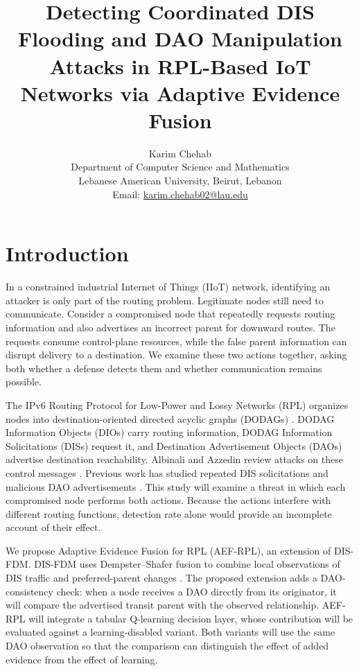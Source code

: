\documentclass[journal]{IEEEtran}
\title{Detecting Coordinated DIS Flooding and DAO Manipulation Attacks in RPL-Based IoT Networks via Adaptive Evidence Fusion}
\author{Karim Chehab\\[0.5ex]
\normalsize Department of Computer Science and Mathematics\\
\normalsize Lebanese American University, Beirut, Lebanon\\
\normalsize Email: \href{mailto:karim.chehab02@lau.edu}{karim.chehab02@lau.edu}}
\date{}
\begin{document}
\maketitle

\section{Introduction}\label{sec:introduction}
In a constrained industrial Internet of Things (IIoT) network, identifying an attacker is only part of the routing problem. Legitimate nodes still need to communicate. Consider a compromised node that repeatedly requests routing information and also advertises an incorrect parent for downward routes. The requests consume control-plane resources, while the false parent information can disrupt delivery to a destination. We examine these two actions together, asking both whether a defense detects them and whether communication remains possible.

The IPv6 Routing Protocol for Low-Power and Lossy Networks (RPL) organizes nodes into destination-oriented directed acyclic graphs (DODAGs) \cite{rfc6550}. DODAG Information Objects (DIOs) carry routing information, DODAG Information Solicitations (DISs) request it, and Destination Advertisement Objects (DAOs) advertise destination reachability. Albinali and Azzedin review attacks on these control messages \cite{albinali2024}. Previous work has studied repeated DIS solicitations \cite{rajasekar2022,vermaranga2020,medjek2021} and malicious DAO advertisements \cite{pu2018,limsd2024}. This study will examine a threat in which each compromised node performs both actions. Because the actions interfere with different routing functions, detection rate alone would provide an incomplete account of their effect.

We propose Adaptive Evidence Fusion for RPL (AEF-RPL), an extension of DIS-FDM. DIS-FDM uses Dempster--Shafer fusion to combine local observations of DIS traffic and preferred-parent changes \cite{prajisha2025}. The proposed extension adds a DAO-consistency check: when a node receives a DAO directly from its originator, it will compare the advertised transit parent with the observed relationship. AEF-RPL will integrate a tabular Q-learning decision layer, whose contribution will be evaluated against a learning-disabled variant. Both variants will use the same DAO observation so that the comparison can distinguish the effect of added evidence from the effect of learning.
\end{document}
